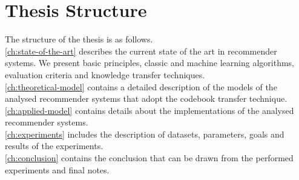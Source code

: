 \section{Thesis Structure}

The structure of the thesis is as follows.\\
\autoref{ch:state-of-the-art} describes the current state of the art in recommender systems. We present basic principles, classic and machine learning algorithms, evaluation criteria and knowledge transfer techniques.\\
\autoref{ch:theoretical-model} contains a detailed description of the models of the analysed recommender systems that adopt the codebook transfer technique.\\
\autoref{ch:applied-model} contains details about the implementations of the analysed recommender systems.\\
\autoref{ch:experiments} includes the description of datasets, parameters, goals and results of the experiments.\\
\autoref{ch:conclusion} contains the conclusion that can be drawn from the performed experiments and final notes.